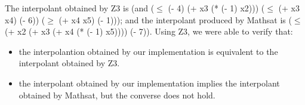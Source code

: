 

The interpolant obtained by Z3 is 
 (and ($\leq$ (- 4) (+ x3 (* (- 1) x2))) ($\leq$ (+ x3 x4) (- 6)) ($\geq$ (+ x4 x5) (- 1))); 
 and the interpolant produced by Mathsat is ($\leq$ (+ x2 (+ x3 (+ x4 (* (- 1) x5)))) (- 7)).
 Using Z3, we were able to verify that: 
 \begin{itemize}
 \item the interpolantion obtained by our implementation
 is equivalent to the interpolant obtained by Z3. 
 \item the interpolant obtained by our implementation implies the interpolant
 obtained by Mathsat, but the converse does not hold.
 \end{itemize}



